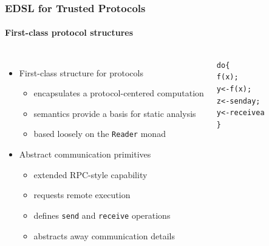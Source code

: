\documentclass{beamer}
\begin{document}
\begin{frame}[fragile]
  \frametitle{EDSL for Trusted Protocols}
  \framesubtitle{First-class protocol structures}

  \begin{columns}[c]
    \begin{itemize}
    \item First-class structure for protocols
      \begin{itemize}
      \item encapsulates a protocol-centered computation
      \item semantics provide a basis for static analysis
      \item based loosely on the \verb+Reader+ monad
      \end{itemize}
    \item Abstract communication primitives
      \begin{itemize}
      \item extended RPC-style capability
      \item requests remote execution
      \item defines \verb+send+ and \verb+receive+ operations
      \item abstracts away communication details
      \end{itemize}
    \end{itemize}
  \begin{alltt}
  do \{
       f(x);
       y <- f(x);
       z <- send a y;
       y <- receive a
  \}
  \end{alltt}
  \end{columns}
\end{frame}
\end{document}
